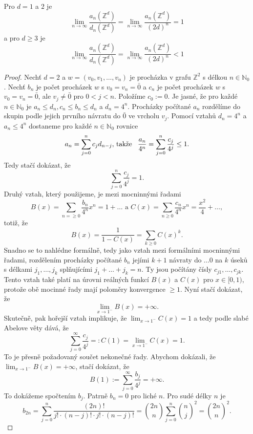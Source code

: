 \documentclass[../main.tex]{subfiles}
\begin{document}
\begin{theorem}[Pólya]
    Pro $d = 1$ a $2$ je \[ \lim_{n\to\infty}\frac{a_n(\mathbb{Z}^d)}{d_n(\mathbb{Z}^d)} = \lim_{n\to\infty}\frac{a_n(\mathbb{Z}^d)}{(2d)^n} = 1 \]
    a pro $d \geq 3$ je
    \[ \lim_{n\to\infty} \frac{a_n(\mathbb{Z}^d)}{d_n(\mathbb{Z}^d)} = \lim_{n\to\infty}\frac{a_n(\mathbb{Z}^d)}{(2d)^n} < 1 \]
\end{theorem}
\begin{proof}
    Nechť $d = 2$ a $w = (v_0, v_1, \dots, v_n)$ je procházka v grafu $\mathbb{Z}^2$ s délkou $n \in \mathbb{N}_0$.
    Nechť $b_n$ je počet procházek $w$ s $v_0 = v_n = \bar{0}$ a $c_n$ je počet procházek $w$ s $v_0 = v_n = \bar{0}$,
    ale $v_j \neq \bar{0}$ pro $ 0 < j < n$. Položíme $c_0 := 0$. Je jasné, že pro každé $n \in \mathbb{N}_0$ je
    $a_n \leq d_n, c_n \leq b_n \leq d_n$ a $d_n = 4^n$. Procházky počítané $a_n$ rozdělíme do skupin podle jejich prvního návratu do 
    $\bar{0}$ ve vrcholu $v_j$. Pomocí vztahů $d_n = 4^n$ a $a_n \leq 4^n$ dostaneme pro každé $n \in \mathbb{N}_0$ rovnice
    \[ a_n = \sum_{j=0}^{n} c_jd_{n-j} \text{, takže} \hspace{3mm} \frac{a_n}{4^n} = \sum_{j=0}^{n} \frac{c_j}{4^j} \leq 1. \]
    Tedy stačí dokázat, že 
    \[ \sum_{j=0}^{n} \frac{c_j}{4^j} = 1.\]
    Druhý vztah, který použijeme, je mezi mocninnými řadami
    \[ B(x) = \sum_{n=\geq 0} \frac{b_n}{4^n}x^n = 1 + \dots \text{ a } C(x) = \sum_{n\geq 0} \frac{c_n}{4^n}x^n = \frac{x^2}{4} + \dots, \]
    totiž, že
    \[ B(x) = \frac{1}{1-C(x)} = \sum_{k \geq 0} C(x)^k. \]
    Snadno se to nahlédne formálně, tedy jako vztah mezi formálními mocninnými řadami, rozdělením procházky počítané $b_n$ jejími $k+1$ návraty do $\dots{0}$
    na $k$ úseků s délkami $j_1, \dots, j_k$ splňujícími $j_1 + \dots + j_k = n$. Ty jsou počítány čísly $c_{j1}, \dots, c_{jk}$.
    Tento vztah také platí na úrovni reálných funkcí $B(x)$ a $C(x)$ pro $x \in [0,1)$, protože obě mocinné řady mají poloměry konvergence $\geq 1$.
    Nyní stačí dokázat, že 
    \[ \lim_{x\to 1^-} B(x) = +\infty. \]
    Skutečně, pak hořejší vztah implikuje, že $\lim_{x\to 1^-} C(x) = 1$ a tedy podle slabé Abelove věty dává, že
    \[ \sum_{j=0}^\infty \frac{c_j}{4^j} =: C(1) = \lim_{x\to 1^-} C(x) = 1. \]
    To je přesně požadovaný součet nekonečné řady.
    Abychom dokázali, že $\lim_{x\to 1^-} B(x) = +\infty$, stačí dokázat, že
    \[ B(1) := \sum_{j = 0}^\infty \frac{b_j}{4^j} = +\infty. \]
    To dokážeme spočtením $b_j$. Patrně $b_n = 0$ pro liché $n$. Pro sudé délky $n$ je
    \[ b_{2n} = \sum_{j=0}^{n}\frac{(2n)!}{j!\cdot (n-j)!\cdot j! \cdot (n-j)!} = \binom{2n}{n} \sum_{j=0}^{n} \binom{n}{j}^2 = \binom{2n}{n}^2. \]

\end{proof}
\end{document}

